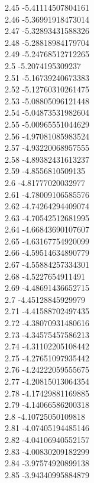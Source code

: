 {2.45	-5.41114507804161\\
2.46	-5.36991918473014\\
2.47	-5.32893431588326\\
2.48	-5.28818984179704\\
2.49	-5.24768512712265\\
2.5	-5.2074195309237\\
2.51	-5.16739240673383\\
2.52	-5.12760310261475\\
2.53	-5.08805096121448\\
2.54	-5.04873531982604\\
2.55	-5.00965551044629\\
2.56	-4.97081085983524\\
2.57	-4.93220068957555\\
2.58	-4.89382431613237\\
2.59	-4.8556810509135\\
2.6	-4.81777020032977\\
2.61	-4.78009106585576\\
2.62	-4.74264294409074\\
2.63	-4.70542512681995\\
2.64	-4.66843690107607\\
2.65	-4.63167754920099\\
2.66	-4.59514634890779\\
2.67	-4.55884257334301\\
2.68	-4.5227654911491\\
2.69	-4.48691436652715\\
2.7	-4.45128845929979\\
2.71	-4.41588702497435\\
2.72	-4.38070931480616\\
2.73	-4.34575457586213\\
2.74	-4.31102205108442\\
2.75	-4.27651097935442\\
2.76	-4.24222059555675\\
2.77	-4.20815013064354\\
2.78	-4.17429881169885\\
2.79	-4.14066586200318\\
2.8	-4.10725050109818\\
2.81	-4.07405194485146\\
2.82	-4.04106940552157\\
2.83	-4.00830209182299\\
2.84	-3.97574920899138\\
2.85	-3.94340995884879\\
}
